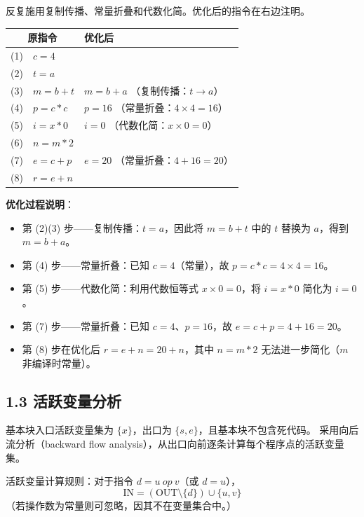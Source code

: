 \documentclass[12pt]{article}
\begin{document}
反复施用复制传播、常量折叠和代数化简。优化后的指令在右边注明。

\begin{center}
\begin{tabular}{lll}
\toprule
\multicolumn{2}{c}{\textbf{原指令}} & \textbf{优化后} \\
\midrule
(1) & $c = 4$ & \\
(2) & $t = a$ & \\
(3) & $m = b + t$ & $m = b + a$ \quad（复制传播：$t \to a$）\\
(4) & $p = c * c$ & $p = 16$ \quad（常量折叠：$4 \times 4 = 16$）\\
(5) & $i = x * 0$ & $i = 0$ \quad（代数化简：$x \times 0 = 0$）\\
(6) & $n = m * 2$ & \\
(7) & $e = c + p$ & $e = 20$ \quad（常量折叠：$4 + 16 = 20$）\\
(8) & $r = e + n$ & \\
\bottomrule
\end{tabular}
\end{center}

\textbf{优化过程说明}：
\begin{itemize}
    \item 第 (2)(3) 步——复制传播：$t = a$，因此将 $m = b + t$ 中的 $t$ 替换为 $a$，得到 $m = b + a$。
    \item 第 (4) 步——常量折叠：已知 $c = 4$（常量），故 $p = c * c = 4 \times 4 = 16$。
    \item 第 (5) 步——代数化简：利用代数恒等式 $x \times 0 = 0$，将 $i = x * 0$ 简化为 $i = 0$。
    \item 第 (7) 步——常量折叠：已知 $c = 4$、$p = 16$，故 $e = c + p = 4 + 16 = 20$。
    \item 第 (8) 步在优化后 $r = e + n = 20 + n$，其中 $n = m * 2$ 无法进一步简化（$m$ 非编译时常量）。
\end{itemize}

\subsection*{1.3 活跃变量分析}

基本块入口活跃变量集为 $\{x\}$，出口为 $\{s, e\}$，且基本块不包含死代码。
采用向后流分析（backward flow analysis），从出口向前逐条计算每个程序点的活跃变量集。

活跃变量计算规则：对于指令 $d = u\ op\ v$（或 $d = u$），
\[
\text{IN} = (\text{OUT} \setminus \{d\}) \cup \{u, v\}
\]
（若操作数为常量则可忽略，因其不在变量集合中。）
\end{document}
